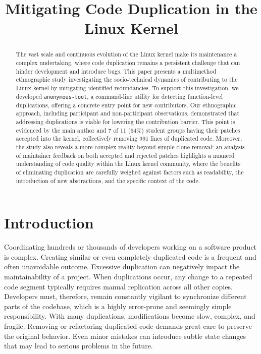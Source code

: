 \documentclass[12pt]{article}
\title{Mitigating Code Duplication in the Linux Kernel}
\begin{document}
 

\maketitle

\begin{abstract}
The vast scale and continuous evolution of the Linux kernel make its maintenance a complex undertaking, where code duplication remains a persistent challenge that can hinder development and introduce bugs. This paper presents a multimethod ethnographic study investigating the socio-technical dynamics of contributing to the Linux kernel by mitigating identified redundancies. To support this investigation, we developed \texttt{anonymous-tool}, a command-line utility for detecting function-level duplications, offering a concrete entry point for new contributors. Our ethnographic approach, including participant and non-participant observations, demonstrated that addressing duplications is viable for lowering the contribution barrier. This point is evidenced by the main author and 7 of 11 (64\%) student groups having their patches accepted into the kernel, collectively removing 991 lines of duplicated code. Moreover, the study also reveals a more complex reality beyond simple clone removal: an analysis of maintainer feedback on both accepted and rejected patches highlights a nuanced understanding of code quality within the Linux kernel community, where the benefits of eliminating duplication are carefully weighed against factors such as readability, the introduction of new abstractions, and the specific context of the code.
\end{abstract}


\section{Introduction}
\label{sec:introduction}

Coordinating hundreds or thousands of developers working on a software product is complex. Creating similar or even completely duplicated code is a frequent and often unavoidable outcome. Excessive duplication can negatively impact the maintainability of a project. When duplications occur, any change to a repeated code segment typically requires manual replication across all other copies. Developers must, therefore, remain constantly vigilant to synchronize different parts of the codebase, which is a highly error-prone and seemingly simple responsibility. With many duplications, modifications become slow, complex, and fragile. Removing or refactoring duplicated code demands great care to preserve the original behavior. Even minor mistakes can introduce subtle state changes that may lead to serious problems in the future.
\end{document}
